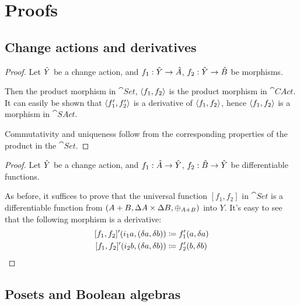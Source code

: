 \printbibliography

\clearpage
\appendix
\appendixpage
\section{Proofs}

\subsection{Change actions and derivatives}

\products*
\begin{proof}
  \label{prf:products}
  Let $\hat{Y}$ be a change action, and $f_1: \hat{Y} \rightarrow \hat{A}$, $f_2: \hat{Y}
  \rightarrow \hat{B}$ be morphisms.

  Then the product morphism in $\cat{Set}$, $\left\langle {f_1}, {f_2} \right\rangle$ is the product
  morphism in $\cat{CAct}$. It can easily be
  shown that $\left\langle {f_1'}, {f_2'} \right\rangle$ is a derivative of $\left\langle {f_1}, {f_2} \right\rangle$,
  hence $\left\langle {f_1}, {f_2} \right\rangle$ is a morphism in $\cat{SAct}$.

  Commutativity and uniqueness follow from the corresponding properties of the
  product in the $\cat{Set}$.
\end{proof}

\disjointUnions*
\begin{proof}
  \label{prf:disjointUnions}
  Let $\hat{Y}$ be a change action, and $f_1 : \hat{A} \rightarrow \hat{Y}$, $f_2 : \hat{B}
  \rightarrow \hat{Y}$ be differentiable functions.

  As before, it suffices to prove that the universal function $[f_1, f_2]$ in $\cat{Set}$ is a differentiable
  function from $(A + B,\Delta A \times \Delta B,\oplus_{A + B})$ into $Y$. It's easy to see
  that the following morphism is a derivative:
  \begin{align*}
    \derive{[f_1, f_2]} (i_1 a, (\change{a}, \change{b})) &\defeq f_1'(a, \change{a})\\
    \derive{[f_1, f_2]} (i_2 b, (\change{a}, \change{b})) &\defeq f_2'(b, \change{b})
  \end{align*}
\end{proof}

\subsection{Posets and Boolean algebras}

